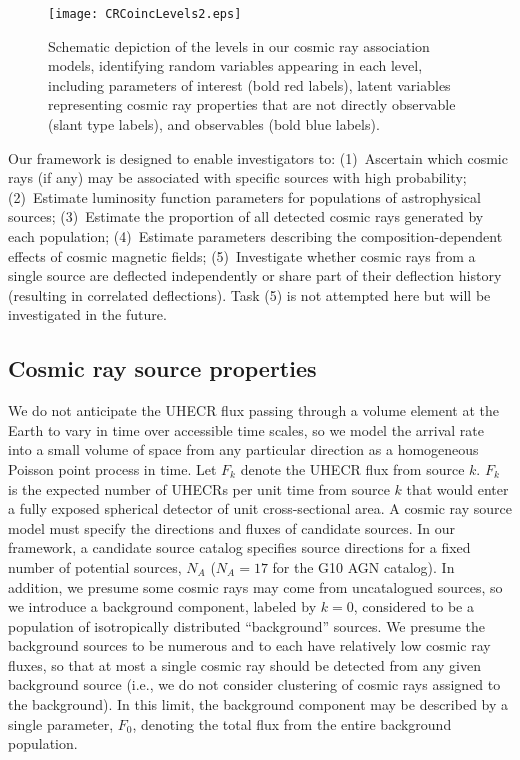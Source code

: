 \begin{figure}
\centerline{\texttt{[image: CRCoincLevels2.eps]}}
\caption{Schematic depiction of the levels in our cosmic ray association
models, identifying random variables appearing in each level, including
parameters of interest (bold red labels), latent variables representing cosmic ray
properties that are not directly observable (slant type labels), and
observables (bold blue labels).}
\label{fig:levels}
\end{figure}

Our framework is designed to enable investigators to:
(1)~Ascertain which cosmic rays (if any) may be associated with specific
sources with high probability; (2)~Estimate luminosity function parameters
for populations of astrophysical sources; (3)~Estimate the proportion of all
detected cosmic rays generated by each population; (4)~Estimate parameters
describing the composition-dependent effects of cosmic magnetic fields;
(5)~Investigate whether cosmic rays from a single source are deflected
independently or share part of their deflection history (resulting in
correlated deflections).  Task (5) is not attempted here but will be
investigated in the future.

\subsection{Cosmic ray source properties}


We do not anticipate the UHECR flux passing through a volume element at the
Earth to vary in time over accessible time scales, so we model the
arrival rate into a small volume of space from any particular direction as a
homogeneous Poisson point process in time.  Let $F_k$ denote the UHECR flux
from source $k$.  $F_k$ is the expected number of UHECRs per unit time from
source $k$ that would enter a fully exposed spherical detector of unit
cross-sectional area.  A cosmic ray source model must specify the directions
and fluxes of candidate sources.  In our framework, a candidate source
catalog specifies source directions for a fixed number of potential sources,
$N_A$ ($N_A = 17$ for the G10 AGN catalog).  In addition, we presume some
cosmic rays may come from uncatalogued sources, so we introduce a background
component, labeled by $k=0$, considered to be a population of isotropically
distributed ``background'' sources.   We presume the background sources to
be numerous and to each have relatively low cosmic ray fluxes, so that at
most a single cosmic ray should be detected from any given background source
(i.e., we do not consider clustering of cosmic rays assigned to the
background).  In this limit, the background component may be described
by a single parameter, $F_0$, denoting the total flux from the entire
background population.

